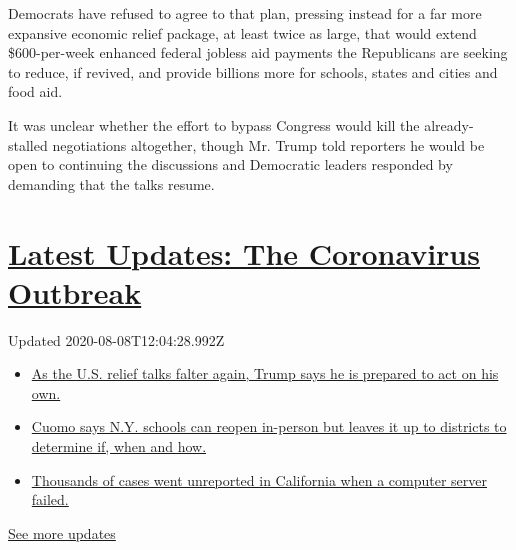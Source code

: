 Democrats have refused to agree to that plan, pressing instead for a far
more expansive economic relief package, at least twice as large, that
would extend \$600-per-week enhanced federal jobless aid payments the
Republicans are seeking to reduce, if revived, and provide billions more
for schools, states and cities and food aid.

It was unclear whether the effort to bypass Congress would kill the
already-stalled negotiations altogether, though Mr. Trump told reporters
he would be open to continuing the discussions and Democratic leaders
responded by demanding that the talks resume.

\hypertarget{latest-updates-the-coronavirus-outbreak}{%
\section{\texorpdfstring{\href{https://www.nytimes.com/2020/08/07/world/covid-19-news.html?action=click\&pgtype=Article\&state=default\&region=MAIN_CONTENT_1\&context=storylines_live_updates}{Latest
Updates: The Coronavirus
Outbreak}}{Latest Updates: The Coronavirus Outbreak}}\label{latest-updates-the-coronavirus-outbreak}}

Updated 2020-08-08T12:04:28.992Z

\begin{itemize}
\tightlist
\item
  \href{https://www.nytimes.com/2020/08/07/world/covid-19-news.html?action=click\&pgtype=Article\&state=default\&region=MAIN_CONTENT_1\&context=storylines_live_updates\#link-1f86d03a}{As
  the U.S. relief talks falter again, Trump says he is prepared to act
  on his own.}
\item
  \href{https://www.nytimes.com/2020/08/07/world/covid-19-news.html?action=click\&pgtype=Article\&state=default\&region=MAIN_CONTENT_1\&context=storylines_live_updates\#link-3f64a70a}{Cuomo
  says N.Y. schools can reopen in-person but leaves it up to districts
  to determine if, when and how.}
\item
  \href{https://www.nytimes.com/2020/08/07/world/covid-19-news.html?action=click\&pgtype=Article\&state=default\&region=MAIN_CONTENT_1\&context=storylines_live_updates\#link-14e70066}{Thousands
  of cases went unreported in California when a computer server failed.}
\end{itemize}

\href{https://www.nytimes.com/2020/08/07/world/covid-19-news.html?action=click\&pgtype=Article\&state=default\&region=MAIN_CONTENT_1\&context=storylines_live_updates}{See
more updates}


